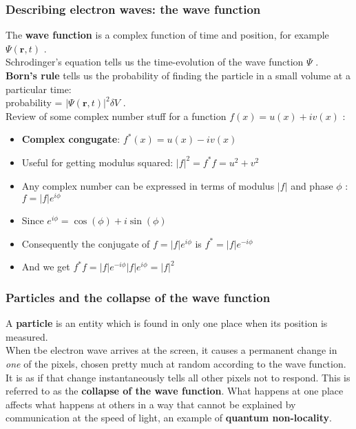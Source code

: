 \documentclass{article}
\begin{document}
\subsubsection{Describing electron waves: the wave function}
The \textbf{wave function} is a complex function of time and position, for example $\Psi(\mathbf{r},t)$ . \\
Schrodinger's equation tells us the time-evolution of the wave function $\Psi$ . \\
\textbf{Born's rule} tells us the probability of finding the particle in a small volume at a particular time:\\
probability = $ | \Psi(\mathbf{r},t)|^2 \delta V $ . \\
Review of some complex number stuff for a function $ f(x) = u(x) + i v(x) $ : \\
\begin{itemize}
    \item \textbf{Complex congugate}: $ f^*(x) = u(x) - iv(x) $
    \item Useful for getting modulus squared: $ |f|^2 = f^*f = u^2+v^2 $
    \item Any complex number can be expressed in terms of modulus $|f|$ and phase $\phi$ : $f = |f|e^{i\phi}$
    \item Since $ e^{i\phi} = \cos(\phi) + i\sin(\phi) $
    \item Consequently the conjugate of $ f=|f|e^{i\phi} $ is $ f^*=|f|e^{-i\phi} $
    \item And we get $ f^*f = |f|e^{-i\phi} |f|e^{i\phi} = |f|^2 $
\end{itemize}
\subsubsection{Particles and the collapse of the wave function}
A \textbf{particle} is an entity which is found in only one place when its position is measured.\\
When tbe electron wave arrives at the screen, it causes a permanent change in \emph{one} of the pixels, chosen pretty much at random according to the wave function. It is as if that change instantaneously tells all other pixels not to respond. This is referred to as the \textbf{collapse of the wave function}. What happens at one place affects what happens at others in a way that cannot be explained by communication at the speed of light, an example of \textbf{quantum non-locality}.\\
\end{document}
